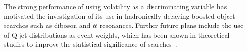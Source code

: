 The strong performance of using volatility as a discriminating variable has motivated the investigation of its use in hadronically-decaying boosted object searches such as diboson and $t\bar{t}$ resonances. Further future plans include the use of Q-jet distributions as event weights, which has been shown in theoretical studies to improve the statistical significance of searches~\cite{Ellis:2012sn,Kahawala:2013sba}.



